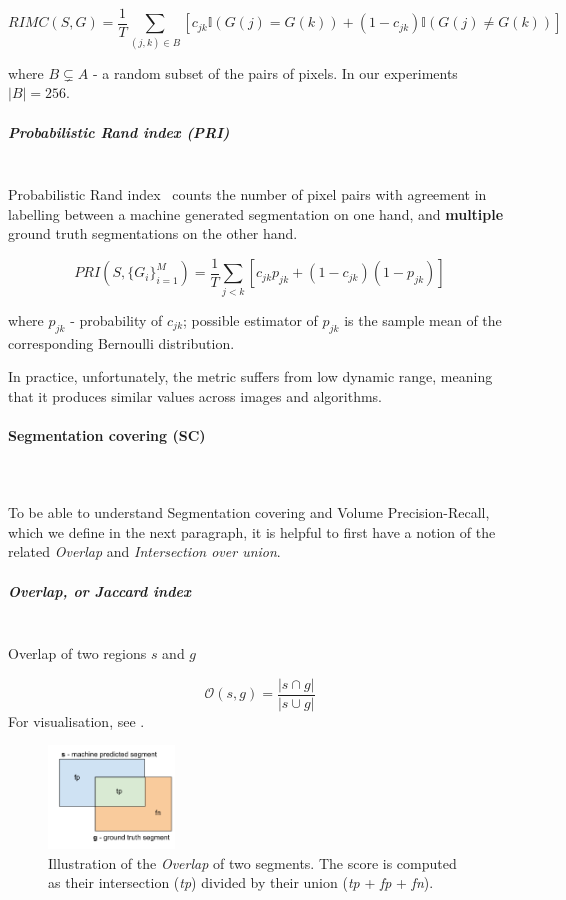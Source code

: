 \[
RIMC(S,G)=\frac{1}{T}\sum\limits _{(j,k)\in B}\left[c_{jk}\mathbb{I}\left(G(j)=G(k)\right)+(1-c_{jk})\mathbb{I}\left(G(j)\neq G(k)\right)\right]
\]

where $B\subsetneq A$ - a random subset of the pairs of pixels.
In our experiments $|B|=256$.


\subparagraph{Probabilistic Rand index (PRI)}\mbox{}\\
\label{par:ch4-PRI-maths}
Probabilistic Rand index~\cite{UnnikrishnanPH07} counts the number of pixel pairs with agreement in %
labelling between a machine generated segmentation on one hand, and \textbf{multiple} ground truth segmentations on the other hand.


\[
PRI(S,\{G_{i}\}_{i=1}^{M})=\frac{1}{T}\sum\limits _{j<k}\left[c_{jk}p_{jk}+\left(1-c_{jk}\right)\left(1-p_{jk}\right)\right]
\]

where $p_{jk}$ - probability of $c_{jk}$; possible estimator of
$p_{jk}$ is the sample mean of the corresponding Bernoulli distribution.

In practice, unfortunately, the metric suffers from low dynamic range, meaning that it produces similar values across images and algorithms.

\paragraph{Segmentation covering (SC)}\mbox{}\\\mbox{}\\
\label{par:ch4-SC-maths}
To be able to understand Segmentation covering and Volume Precision-Recall, which we define in the next paragraph, it is helpful to first have a notion of the related \textit{Overlap} and \textit{Intersection over union}.

\subparagraph{Overlap, or Jaccard index}\mbox{}\\
Overlap of two regions %
$s$ and $g$

\[
\mathcal{O}\left(s,g\right)=\frac{\left|s\cap g\right|}{\left|s\cup g\right|}
\]
For visualisation, see .

\begin{figure}[ht!]
\centering
\includegraphics[width=0.3\textwidth]{images/scoring_fcns/intersection-over-union_score_illustrated.png}
\caption[Illustration of the \textit{Overlap} of two segments]{Illustration of the \textit{Overlap} of two segments. The score is computed as their intersection (\textit{tp}) divided by their union (\textit{tp} + \textit{fp} + \textit{fn}).}
\label{fig:overlap-IoU}
\end{figure}

